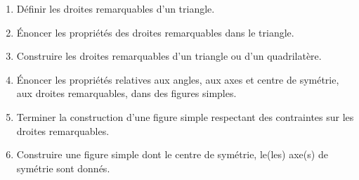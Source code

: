 \documentclass[../../syllabus_1.tex]{subfiles}
\begin{document}
\begin{enumerate}[label=\textbf{\arabic*.}]
    \item Définir les droites remarquables d'un triangle.
    \item Énoncer les propriétés des droites remarquables dans le triangle.
    \item Construire les droites remarquables d'un triangle ou d'un quadrilatère.
    \item Énoncer les propriétés relatives aux angles, aux axes et centre de symétrie, aux droites remarquables, dans des figures simples.
    \item Terminer la construction d'une figure simple respectant des contraintes sur les droites remarquables.
    \item Construire une figure simple dont le centre de symétrie, le(les) axe(s) de symétrie sont donnés.
\end{enumerate}
\end{document}
